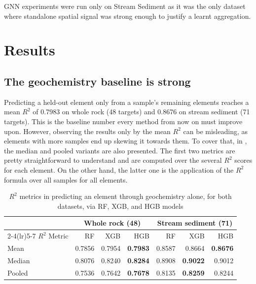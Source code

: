 \documentclass[
    a4paper,
    11pt,
    oneside,
    numbers=noendperiod,
    abstract=true
]{scrartcl}
\newcommand{\Rsq}{$R^2$}
\begin{document}
GNN experiments were run only on Stream Sediment as it was the only dataset where standalone spatial signal was strong enough to justify a learnt aggregation.

\section{Results}
\label{ch:results}

\subsection{The geochemistry baseline is strong}
\label{sec:baseline}

Predicting a held-out element only from a sample's remaining elements reaches a mean \Rsq{} of \num{0.7983} on whole rock (48 targets) and \num{0.8676} on stream sediment (71 targets). This is the baseline number every method from now on must improve upon. However, observing the results only by the mean \Rsq{} can be misleading, as elements with more samples end up skewing it towards them. To cover that, in , the median and pooled variants are also presented. The first two metrics are pretty straightforward to understand and are computed over the several \Rsq{} scores for each element. On the other hand, the latter one is the application of the \Rsq{} formula over all samples for all elements.

\begin{table}[htbp]
\centering
\caption[\Rsq{} metrics across both datasets]{\Rsq{} metrics in predicting an element through geochemistry alone, for both datasets, via RF, XGB, and HGB models}
\label{tab:tabularRes}
\begin{tabular}{lrrr rrr}
\toprule
 & \multicolumn{3}{c}{Whole rock (48)} & \multicolumn{3}{c}{Stream sediment (71)} \\
\cmidrule(lr){2-4}\cmidrule(lr){5-7}
\Rsq{} Metric & RF & XGB & HGB & RF & XGB & HGB \\
\midrule
Mean   & \num{0.7856} & \num{0.7954} & \textbf{0.7983} & \num{0.8587} & \num{0.8664} & \textbf{0.8676} \\
Median & \num{0.8076} & \num{0.8240} & \textbf{0.8284} & \num{0.8908} & \textbf{0.9022} & \num{0.9012} \\
Pooled & \num{0.7536} & \num{0.7642} & \textbf{0.7678} & \num{0.8135} & \textbf{0.8259} & \num{0.8244} \\
\bottomrule
\end{tabular}
\end{table}
\end{document}
